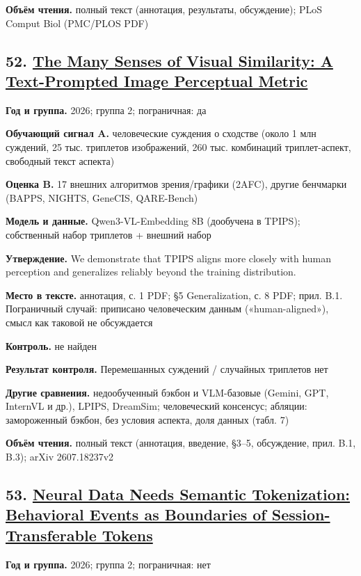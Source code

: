 \textbf{Объём чтения.} полный текст (аннотация, результаты, обсуждение); PLoS Comput Biol (PMC/PLOS PDF)


\subsection*{52. \href{https://doi.org/10.48550/arxiv.2607.18237}{The Many Senses of Visual Similarity: A Text-Prompted Image Perceptual Metric}}

\textbf{Год и группа.} 2026; группа 2; пограничная: да

\textbf{Обучающий сигнал A.} человеческие суждения о сходстве (около 1 млн суждений, 25 тыс. триплетов изображений, 260 тыс. комбинаций триплет-аспект, свободный текст аспекта)

\textbf{Оценка B.} 17 внешних алгоритмов зрения/графики (2AFC), другие бенчмарки (BAPPS, NIGHTS, GeneCIS, QARE-Bench)

\textbf{Модель и данные.} Qwen3-VL-Embedding 8B (дообучена в TPIPS); собственный набор триплетов + внешний набор

\textbf{Утверждение.} We demonstrate that TPIPS aligns more closely with human perception and generalizes reliably beyond the training distribution.

\textbf{Место в тексте.} аннотация, с. 1 PDF; §5 Generalization, с. 8 PDF; прил. B.1. Пограничный случай: приписано человеческим данным («human-aligned»), смысл как таковой не обсуждается

\textbf{Контроль.} не найден

\textbf{Результат контроля.} Перемешанных суждений / случайных триплетов нет

\textbf{Другие сравнения.} недообученный бэкбон и VLM-базовые (Gemini, GPT, InternVL и др.), LPIPS, DreamSim; человеческий консенсус; абляции: замороженный бэкбон, без условия аспекта, доля данных (табл. 7)

\textbf{Объём чтения.} полный текст (аннотация, введение, §3–5, обсуждение, прил. B.1, B.3); arXiv 2607.18237v2


\subsection*{53. \href{https://openalex.org/W7220748548}{Neural Data Needs Semantic Tokenization: Behavioral Events as Boundaries of Session-Transferable Tokens}}

\textbf{Год и группа.} 2026; группа 2; пограничная: нет

